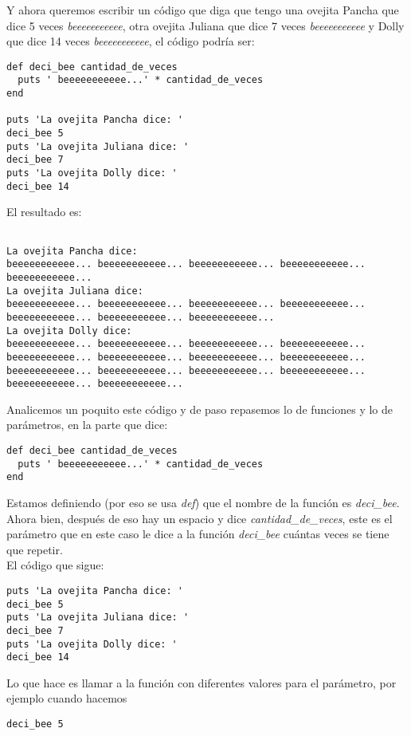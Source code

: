 Y ahora queremos escribir un código que diga que tengo una ovejita Pancha que dice 5 veces \emph{beeeeeeeeeee}, otra ovejita Juliana que dice 7 veces \emph{beeeeeeeeeee} y Dolly que dice 14 veces \emph{beeeeeeeeeee}, el código podría ser:

\begin{lstlisting}
def deci_bee cantidad_de_veces
  puts ' beeeeeeeeeee...' * cantidad_de_veces
end

puts 'La ovejita Pancha dice: ' 
deci_bee 5
puts 'La ovejita Juliana dice: ' 
deci_bee 7
puts 'La ovejita Dolly dice: ' 
deci_bee 14
\end{lstlisting}

El resultado es:
\begin{lstlisting}

La ovejita Pancha dice: 
beeeeeeeeeee... beeeeeeeeeee... beeeeeeeeeee... beeeeeeeeeee... beeeeeeeeeee...
La ovejita Juliana dice: 
beeeeeeeeeee... beeeeeeeeeee... beeeeeeeeeee... beeeeeeeeeee... beeeeeeeeeee... beeeeeeeeeee... beeeeeeeeeee...
La ovejita Dolly dice: 
beeeeeeeeeee... beeeeeeeeeee... beeeeeeeeeee... beeeeeeeeeee... beeeeeeeeeee... beeeeeeeeeee... beeeeeeeeeee... beeeeeeeeeee... beeeeeeeeeee... beeeeeeeeeee... beeeeeeeeeee... beeeeeeeeeee... beeeeeeeeeee... beeeeeeeeeee...
\end{lstlisting}

Analicemos un poquito este código y de paso repasemos lo de funciones y lo de parámetros, en la parte que dice:
\begin{lstlisting}
def deci_bee cantidad_de_veces
  puts ' beeeeeeeeeee...' * cantidad_de_veces
end
\end{lstlisting}

Estamos definiendo (por eso se usa \emph{def}) que el nombre de la función es \emph{deci\_bee}. Ahora bien, después de eso hay un espacio y dice \emph{cantidad\_de\_veces}, este es el parámetro que en este caso le dice a la función \emph{deci\_bee} cuántas veces se tiene que repetir.\\

El código que sigue:
\begin{lstlisting}
puts 'La ovejita Pancha dice: ' 
deci_bee 5
puts 'La ovejita Juliana dice: ' 
deci_bee 7
puts 'La ovejita Dolly dice: ' 
deci_bee 14
\end{lstlisting}

Lo que hace es llamar a la función con diferentes valores para el parámetro, por ejemplo cuando hacemos 
\begin{lstlisting}
deci_bee 5
\end{lstlisting}

